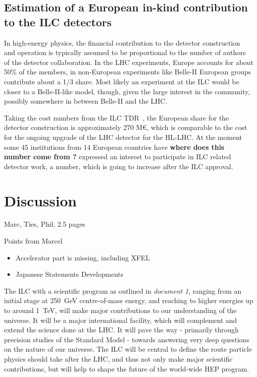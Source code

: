\documentclass[%
 reprint,
 amsmath,amssymb,
 aps,
]{revtex4-1}
\begin{document}
\subsection{\label{Section:constructionmodel:ILCDet} Estimation of a
European in-kind contribution to the ILC detectors}

In high-energy physics, the financial contribution to the detector
construction and operation
is typically assumed to be proportional to the number of authors of
the detector collaboration. In the LHC experiments, Europe accounts for about 50\% of the members, in non-European experiments like Belle-II European groups contribute about a 1/3 share. Most likely an experiment at the ILC would be closer to a Belle-II-like model, though, given the large interest in the community, possibly somewhere in between Belle-II and the LHC. 

Taking the cost numbers from the ILC TDR~\cite{Behnke:2013lya}, the European share for the detector construction is approximately 270 M\euro{}, which is comparable to the cost for the ongoing upgrade of the LHC detector for the HL-LHC. At the moment some 45 institutions from 14 European countries have {\bfseries where does this number come from ?} expressed an interest to participate in ILC related detector work, a number, which is going to increase after the ILC approval.

\section{\label{sec:discussion}Discussion}

Marc, Ties, Phil, 2.5 pages

Points from Marcel
\begin{itemize}
    \item Accelerator part is missing, including XFEL
    \item Japanese Statements Developments
\end{itemize}




The ILC with a scientific program as outlined in {\it document 1}, ranging from 
an initial stage at 250~GeV centre-of-mass energy, and reaching to higher 
energies up to around 1~TeV, will make major contributions to our understanding 
of the universe. It will be a major international facility, which will 
complement and extend the science done at the LHC. It will pave the way - 
primarily through precision studies of the Standard Model - towards answering 
very deep questions on the nature of our universe. The ILC will be central to 
define the route particle physics should take after the LHC, and thus not only 
make major scientific contributions, but will help to shape the future of the 
world-wide HEP program. 
\end{document}
